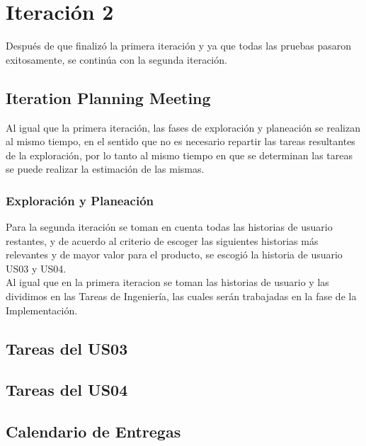 \section{Iteración 2}
\label{sec:iteracion_2}

Después de que finalizó la primera iteración y ya que todas las pruebas pasaron exitosamente, se continúa con la segunda iteración.


\subsection{Iteration Planning Meeting}
\label{sub:iteration2_planning_meeting}


Al igual que la primera iteración, las fases de exploración y planeación se realizan al mismo tiempo, en el sentido que no es necesario repartir las tareas resultantes de la exploración, por lo tanto al mismo tiempo en que se determinan las tareas se puede realizar la estimación de las mismas.

  \subsubsection{Exploración y Planeación}
  \label{subs:iteration2_exploracion_planeacion}

  Para la segunda iteración se toman en cuenta todas las historias de usuario restantes, y de acuerdo al criterio de escoger las siguientes historias más relevantes y de mayor valor para el producto, se escogió la historia de usuario US03 y US04.\\

  Al igual que en la primera iteracion se toman las historias de usuario y las dividimos en las Tareas de Ingeniería, las cuales serán trabajadas en la fase de la Implementación.

  \subsection{Tareas del US03}
  \label{sub:us03_tasks}

    


  \subsection{Tareas del US04}
  \label{sub:us04_tasks}

    


  \subsection{Calendario de Entregas}
  \label{subs:schedule_2}

